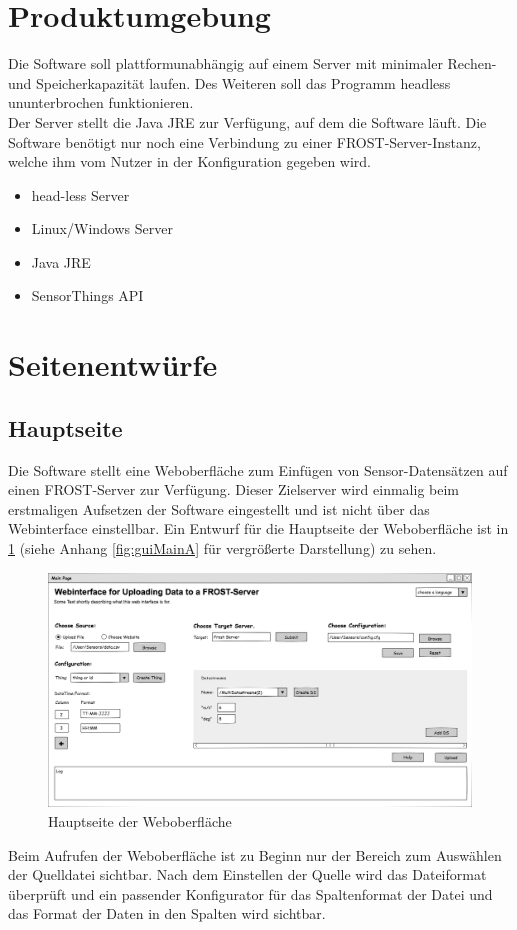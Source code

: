\documentclass[12 pt]{article}
\begin{document}
	\section{Produktumgebung}
	Die Software soll plattformunabhängig auf einem Server mit minimaler Rechen- und Speicherkapazität laufen. Des Weiteren soll das Programm headless ununterbrochen funktionieren.\\ Der Server stellt die Java JRE zur Verfügung, auf dem die Software läuft. Die Software benötigt nur noch eine Verbindung zu einer FROST-Server-Instanz, welche ihm vom Nutzer in der Konfiguration gegeben wird.
	
	\begin{itemize}
		\item head-less Server
		\item Linux/Windows Server
		\item Java JRE
		\item SensorThings API
	\end{itemize}
	
\section{Seitenentwürfe}

\subsection{Hauptseite}
Die Software stellt eine Weboberfläche zum Einfügen von Sensor-Datensätzen auf einen FROST-Server zur Verfügung. 
Dieser Zielserver wird einmalig beim erstmaligen Aufsetzen der Software eingestellt und ist nicht über das Webinterface einstellbar. 
Ein Entwurf für die Hauptseite der Weboberfläche ist in \cref{fig:guiMain} (siehe Anhang \cref{fig:guiMainA} für vergrößerte Darstellung) zu sehen.
\\

\begin{figure}[htbp]
\centering
\includegraphics[scale=0.4]{images/gui}
\caption{\label{fig:guiMain}Hauptseite der Weboberfläche}
\end{figure}
Beim Aufrufen der Weboberfläche ist zu Beginn nur der Bereich zum Auswählen der Quelldatei sichtbar. 
Nach dem Einstellen der Quelle wird das Dateiformat überprüft und ein passender Konfigurator für das Spaltenformat der Datei und das Format der Daten in den Spalten wird sichtbar. \\
\end{document}
